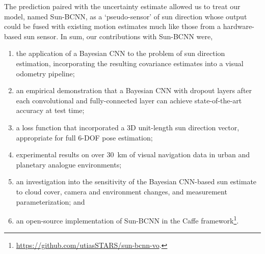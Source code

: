 The prediction paired with the uncertainty estimate allowed us to treat our model, named Sun-BCNN, as a `pseudo-sensor' of sun direction whose output could be fused with existing motion estimates much like those from a hardware-based sun sensor. In sum, our contributions with Sun-BCNN were,
\begin{enumerate}
\item the application of a Bayesian CNN to the problem of sun direction estimation, incorporating the resulting covariance estimates into a visual odometry pipeline; 
\item an empirical demonstration that a Bayesian CNN with dropout layers after each convolutional and fully-connected layer can achieve state-of-the-art accuracy at test time;
\item a loss function that incorporated a 3D unit-length sun direction vector, appropriate for full 6-DOF pose estimation;
\item experimental results on over 30~km of visual navigation data in urban \citep{Geiger2013-ky} and planetary analogue \citep{Furgale2012-kk} environments; 
\item an investigation into the sensitivity of the Bayesian CNN-based sun estimate to cloud cover, camera and environment changes, and measurement parameterization; and
\item an open-source implementation of Sun-BCNN in the Caffe framework\footnote{\url{https://github.com/utiasSTARS/sun-bcnn-vo}.}.
\end{enumerate}

